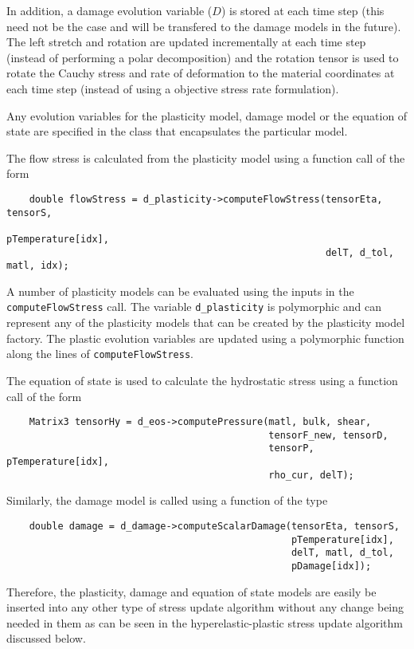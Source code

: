 In addition, a damage evolution variable ($D$) is stored at each time 
step (this need not be the case and will be transfered to the 
damage models in the future).  The left stretch and rotation are 
updated incrementally at each
time step (instead of performing a polar decomposition) and the 
rotation tensor is used to rotate the Cauchy stress and rate of deformation
to the material coordinates at each time step (instead of using a 
objective stress rate formulation).  

Any evolution variables for the plasticity model, damage model or the
equation of state are specified in the class that encapsulates the 
particular model.  

The flow stress is calculated from the plasticity model using a 
function call of the form
\lstset{language=C++}
\begin{lstlisting}
    double flowStress = d_plasticity->computeFlowStress(tensorEta, tensorS, 
                                                        pTemperature[idx],
                                                        delT, d_tol, matl, idx);
\end{lstlisting}
A number of plasticity models can be evaluated using the inputs in the
\verb+computeFlowStress+ call.  The variable \verb+d_plasticity+ is
polymorphic and can represent any of the plasticity models that can be
created by the plasticity model factory.  The plastic evolution variables
are updated using a polymorphic function along the lines of
\verb+computeFlowStress+.

The equation of state is used to calculate the hydrostatic stress using
a function call of the form
\lstset{language=C++}
\begin{lstlisting}
    Matrix3 tensorHy = d_eos->computePressure(matl, bulk, shear, 
                                              tensorF_new, tensorD, 
                                              tensorP, pTemperature[idx], 
                                              rho_cur, delT);
\end{lstlisting}

Similarly, the damage model is called using a function of the type
\lstset{language=C++}
\begin{lstlisting}
    double damage = d_damage->computeScalarDamage(tensorEta, tensorS, 
                                                  pTemperature[idx],
                                                  delT, matl, d_tol, 
                                                  pDamage[idx]);
\end{lstlisting}

Therefore, the plasticity, damage and equation of state models are 
easily be inserted into any other type of stress update algorithm 
without any change being needed in them as can be seen in the 
hyperelastic-plastic stress update algorithm discussed below.

